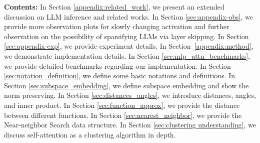 \newpage
\appendix
\onecolumn




\textbf{Contents:} In Section \ref{appendix:related_work}, we present an extended discussion on LLM inference and related works. In Section \ref{sec:appendix-obs}, we provide more observation plots for slowly changing activation and further observation on the possibility of sparsifying LLMs via layer skipping. In Section \ref{sec:appendix-exp}, we provide experiment details. In Section~\ref{appendix:method}, we demonstrate implementation details. In Section \ref{sec:mlp_attn_benchmarks}, we provide detailed benchmarks regarding our implementation. 
In Section \ref{sec:notation_definition}, we define some basic notations and definitions.
In Section \ref{sec:subspace_embedding}, we define subspace embedding and show the norm preserving.
In Section \ref{sec:distances_angles}, we introduce  distances, angles, and inner product.
In Section \ref{sec:function_approx}, we provide the distance between different functions.
In Section \ref{sec:nearest_neighbor}, we provide the Near-neighbor Search data structure.
 In Section \ref{sec:clustering understanding}, we discuss self-attention as a clustering algorithm in depth.








